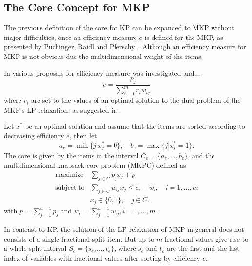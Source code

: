 \subsection{The Core Concept for MKP}

The previous definition of the core for KP can be expanded to MKP without major difficulties,
once an efficiency measure $e$ is defined for the MKP,
as presented by Puchinger, Raidl and Pferschy~\cite{puchinger2006core}.
Although an efficiency measure for MKP is not obvious due the
multidimensional weight of the items.

In \cite{puchinger2006core} various proposals for efficiency measure was
investigated and...
\begin{displaymath}
  e = \frac{p_j}{\sum_{i=1}^m r_iw_{ij}}
\end{displaymath}
where $r_i$ are set to the values of an optimal solution to the dual problem of
the MKP's LP-relaxation, as suggested in \cite{Chu-Beasley-1998}.

Let $x^*$ be an optimal solution and assume that the items are sorted according
to decreasing efficiency $e$, then let
\begin{displaymath}
  a_e = \min \{ j | x_j^* = 0 \}, \quad b_e = \max \{ j | x_j^* = 1 \}.
\end{displaymath}
The core is given by the items in the interval $C_e = \{ a_e, \ldots, b_e \}$,
and the multidimensional knapsack core problem (MKPC) defined as
\begin{align*}
  \text{maximize} & \sum_{j \in C} p_j x_j  + \tilde{p}\\
  \text{subject to} & \sum_{j \in C} w_{ij} x_j \leqslant c_i - \tilde{w}_i, \quad i = 1, \ldots, m\\
  & x_j \in \{0, 1\}, \quad j \in C.
\end{align*}
with $\tilde{p} = \sum^{a-1}_{j=1} p_j$  and $\tilde{w}_i = \sum^{a-1}_{j=1} w_{ij}, i = 1, \ldots, m$.

In contrast to KP, the solution of the LP-relaxation of MKP in general does not
consists of a single fractional split item. But up to $m$ fractional values give
rise to a whole split interval $S_e = \{ s_e, \ldots, t_e \}$, where
$s_e$ and $t_e$ are the first and the last index of variables with fractional
values after sorting by efficiency $e$.



\cite{puchinger2006core}


